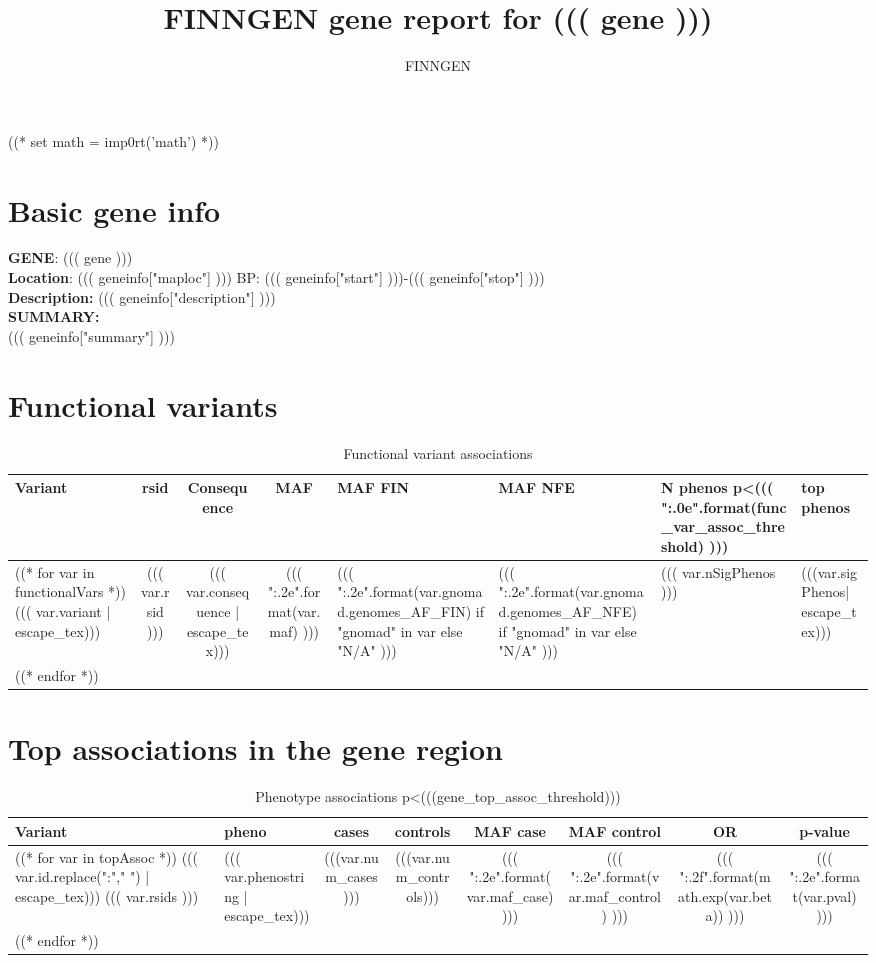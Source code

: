 \documentclass{article}
\begin{document}
\title {FINNGEN gene report for ((( gene ))) }
\author{FINNGEN}
\maketitle
\newpage
\newpage
((* set math = imp0rt('math') *))
\section{ Basic gene info }
\textbf{GENE}: ((( gene ))) \\
\medskip
\textbf{Location}: ((( geneinfo["maploc"] ))) BP: ((( geneinfo["start"] )))-((( geneinfo["stop"] ))) \\
\medskip
\textbf{Description:} ((( geneinfo["description"] ))) \\
\medskip
\textbf{SUMMARY:} \\
((( geneinfo["summary"] )))
\newpage



\begingroup
\renewcommand{\arraystretch}{1.5}
\section{ Functional variants }
\begin{longtable}{p{1.5cm}|c|c|c|C{1.3cm}|C{1.3cm}|C{1.2cm}|L{4.8cm} }
\caption{ Functional variant associations }\\
Variant & rsid & Consequence & MAF & MAF FIN & MAF NFE & N phenos p\textless((( "{:.0e}".format(func_var_assoc_threshold) ))) & top phenos \\
\hline
((* for var in functionalVars *))
    ((( var.variant | escape_tex))) & ((( var.rsid ))) & (((  var.consequence | escape_tex))) & ((( "{:.2e}".format(var.maf) ))) & ((( "{:.2e}".format(var.gnomad.genomes_AF_FIN) if "gnomad" in var else "N/A" ))) & ((( "{:.2e}".format(var.gnomad.genomes_AF_NFE) if "gnomad" in var else "N/A" ))) & ((( var.nSigPhenos ))) & (((var.sigPhenos| escape_tex)))  \\
((* endfor *))

\end{longtable}
\newpage

\section{ Top associations in the gene region }
\begin{longtable}{ >{\RaggedRight}p{3cm}|>{\RaggedRight}p{3cm}|c|c|c|c|c|c }
\caption{ Phenotype associations p\textless (((gene_top_assoc_threshold))) }\\
Variant & pheno & cases & controls & MAF case & MAF control & OR & p-value  \\
\hline
((* for var in topAssoc *))
((( var.id.replace(":"," ") | escape_tex))) \newline ((( var.rsids ))) & ((( var.phenostring | escape_tex))) & (((var.num_cases ))) & (((var.num_controls))) & ((( "{:.2e}".format(var.maf_case) ))) & ((( "{:.2e}".format(var.maf_control) ))) & ((( "{:.2f}".format(math.exp(var.beta)) ))) & ((( "{:.2e}".format(var.pval) ))) \\
((* endfor *))
\end{longtable}
\end{document}
